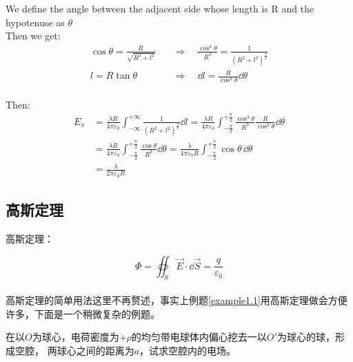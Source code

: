 \documentclass[cn,hazy,blue,14pt,normal]{elegantnote}
\numberwithin{equation}{section}
\begin{document}
\begin{figure}
  \begin{center}
  \end{center}
\end{figure}
\noindent
We define the angle between the adjacent side whose length is R and the hypotenuse as $\theta$​
\\
Then we get:
\begin{equation*}
  \begin{split}
    \cos\theta = \frac{R}{\sqrt{R^2+l^2}}\quad &\Longrightarrow\quad\frac{\cos^3\theta}{R^3}
=\frac{1}{(R^2+l^2)^{\frac{3}{2}}}\\
l=R\tan\theta\quad &\Longrightarrow\quad\dd l=\frac{R}{\cos^2\theta}\dd\theta
  \end{split}
\end{equation*}
\\
Then:
\begin{align*}
	E_x&=\frac{\lambda R}{4\pi\varepsilon_0}\int^{+\infty}_{-\infty}\frac{1}{(R^2+l^2)^{\frac{3}{2}}}\dd l
  =\frac{\lambda R}{4\pi\varepsilon_0}\int^{+\frac{\pi}{2}}_{-\frac{\pi}{2}}\frac{\cos^3\theta}{R^3}\frac{R}{\cos^2\theta}\dd\theta\\
	&=\frac{\lambda R}{4\pi\varepsilon_0}\int^{+\frac{\pi}{2}}_{-\frac{\pi}{2}}\frac{\cos\theta}{R^2}\dd\theta
	=\frac{\lambda}{4\pi\varepsilon_0 R}\int^{+\frac{\pi}{2}}_{-\frac{\pi}{2}}\cos\theta\,\dd\theta\\
	&=\frac{\lambda}{2\pi\varepsilon_0 R}
\end{align*}

\subsection{高斯定理}
\begin{theorem}
  高斯定理：
\end{theorem}
\begin{equation}
  \Phi=\oiint_S\vec{E}\cdot\dd\vec{S}=\frac{q}{\varepsilon_0}
\end{equation}
\\
高斯定理的简单用法这里不再赘述，事实上例题\ref{example1.1}用高斯定理做会方便许多，下面是一个稍微复杂的例题。\\
\begin{example}
  在以$O$为球心，电荷密度为$+\rho$的均匀带电球体内偏心挖去一以$O'$为球心的球，形成空腔，
  两球心之间的距离为$a$，试求空腔内的电场。
\end{example}
\end{document}
